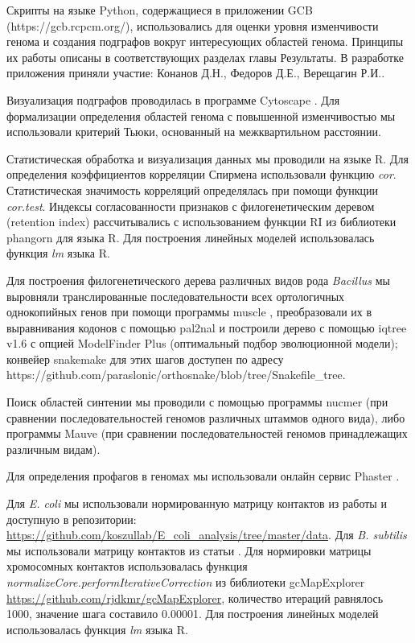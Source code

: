 Скрипты на языке Python, содержащиеся в приложении GCB (https://gcb.rcpcm.org/), использовались для оценки уровня изменчивости генома и создания подграфов вокруг интересующих областей генома. Принципы их работы описаны в соответствующих разделах главы Результаты. В разработке приложения приняли участие: Конанов Д.Н., Федоров Д.Е., Верещагин Р.И.. 

Визуализация подграфов проводилась в программе Cytoscape \cite{smoot2011cytoscape}. Для формализации определения областей генома с повышенной изменчивостью мы использовали критерий Тьюки, основанный на межквартильном расстоянии.

Статистическая обработка и визуализация данных мы проводили на языке R. Для определения коэффициентов корреляции Спирмена использовали функцию \textit{cor}. Статистическая значимость корреляций определялась при помощи функции \textit{cor.test}. Индексы согласованности признаков с филогенетическим деревом (retention index) рассчитывались с использованием функции RI из библиотеки phangorn для языка R. Для построения линейных моделей использовалась функция \textit{lm} языка R.

Для построения филогенетического дерева различных видов рода \textit{Bacillus} мы выровняли транслированные последовательности всех ортологичных однокопийных генов при помощи программы muscle \cite{edgar2004muscle}, преобразовали их в выравнивания кодонов с помощью pal2nal и построили дерево с помощью iqtree v1.6 \cite{nguyen2015iq} с опцией ModelFinder Plus (оптимальный подбор эволюционной модели); конвейер snakemake для этих шагов доступен по адресу https://github.com/paraslonic/orthosnake/blob/tree/Snakefile\_tree. 

Поиск областей синтении мы проводили с помощью программы nucmer \cite{marccais2018mummer4}(при сравнении последовательностей геномов различных штаммов одного вида), либо программы Mauve \cite{darling2004mauve} (при сравнении последовательностей геномов принадлежащих различным видам).

Для определения профагов в геномах мы использовали онлайн сервис Phaster \cite{arndt2016phaster}. 

Для \textit{E. coli} мы использовали нормированную матрицу контактов из работы \cite{lioy2018multiscale} и доступную в репозитории: \url{https://github.com/koszullab/E_coli_analysis/tree/master/data}. Для \textit{B. subtilis} мы использовали матрицу контактов из статьи \cite{marbouty2015condensin}. Для нормировки матрицы хромосомных контактов использовалась функция  \textit{normalizeCore.performIterativeCorrection} из библиотеки gcMapExplorer \url{https://github.com/rjdkmr/gcMapExplorer}, количество итераций равнялось 1000, значение шага составило 0.00001. Для построения линейных моделей использовалась функция \textit{lm} языка R.

